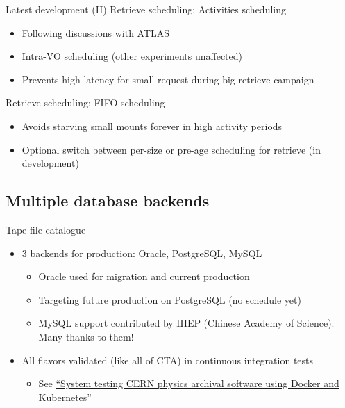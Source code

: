 \documentclass[aspectratio=169]{beamer}
\begin{document}
\begin{frame}{Latest development (II)}
  Retrieve scheduling: Activities scheduling 
  \begin{itemize}
    \item Following discussions with ATLAS
    \item Intra-VO scheduling (other experiments unaffected)
    \item Prevents high latency for small request during big retrieve campaign
  \end{itemize}
  Retrieve scheduling: FIFO scheduling
  \begin{itemize}
    \item Avoids starving small mounts forever in high activity periods
    \item Optional switch between per-size or pre-age scheduling for retrieve (in development)
  \end{itemize}
\end{frame}

\subsection{Multiple database backends}
\begin{frame}{Tape file catalogue}
  \begin{itemize}
    \item 3 backends for production: Oracle, PostgreSQL, MySQL
    \begin{itemize}
      \item Oracle used for migration and current production
      \item Targeting future production on PostgreSQL (no schedule yet)
      \item MySQL support contributed by IHEP (Chinese Academy of Science). Many thanks to them!
    \end{itemize}
    \item All flavors validated (like all of CTA) in continuous integration tests
    \begin{itemize}
      \item See \textcolor{cern}{\href{https://indico.cern.ch/event/773049/contributions/3473307/}{``System testing CERN physics archival software using Docker and Kubernetes''}}
    \end{itemize}
  \end{itemize}
\end{frame}
\end{document}
